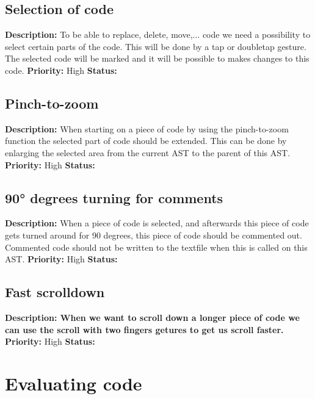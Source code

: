 \documentclass{article}
\begin{document}
\subsection{Selection of code}
\textbf{Description: } To be able to replace, delete, move,... code we need a possibility to select certain parts of the code. This will be done
by a tap or doubletap gesture. The selected code will be marked and it will be possible to makes changes to this code.\newline
\textbf{Priority:} High \newline
\textbf{Status: } \newline
\subsection{Pinch-to-zoom}
\textbf{Description: }When starting on a piece of code by using the pinch-to-zoom function the selected part of code should be extended. This can be done by enlarging the selected
area from the current AST to the parent of this AST. \newline
\textbf{Priority:} High \newline
\textbf{Status: } \newline
\subsection{90° degrees turning for comments}
\textbf{Description: }When a piece of code is selected, and afterwards this piece of code gets turned around for 90 degrees, this piece of code should be commented out. 
Commented code should not be written to the textfile when this is called on this AST. \newline
\textbf{Priority:} High \newline
\textbf{Status: } \newline
\subsection{Fast scrolldown}
\textbf{Description: When we want to scroll down a longer piece of code we can use the scroll with two fingers getures to get us scroll faster.} \newline
\textbf{Priority:} High \newline
\textbf{Status: } \newline
\section{Evaluating code}
\end{document}
